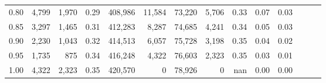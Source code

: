 \begin{tabular}{rrrrrrrrrrrrrr}
0.80 &   4,799 &  1,970 &  0.29 &  408,986 &   11,584 &  73,220 &   5,706 &  0.33 &  0.07 &      0.03 \\
0.85 &   3,297 &  1,465 &  0.31 &  412,283 &    8,287 &  74,685 &   4,241 &  0.34 &  0.05 &      0.03 \\
0.90 &   2,230 &  1,043 &  0.32 &  414,513 &    6,057 &  75,728 &   3,198 &  0.35 &  0.04 &      0.02 \\
0.95 &   1,735 &    875 &  0.34 &  416,248 &    4,322 &  76,603 &   2,323 &  0.35 &  0.03 &      0.01 \\
1.00 &   4,322 &  2,323 &  0.35 &  420,570 &        0 &  78,926 &       0 &   nan &  0.00 &      0.00 \\
\bottomrule
\end{tabular}
